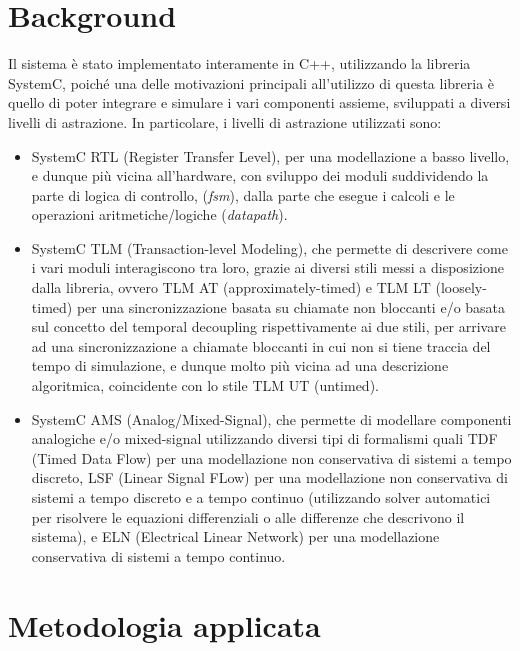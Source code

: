 \documentclass[]{IEEEtran}
\begin{document}
\section{Background}
Il sistema \`e stato implementato interamente in C++, utilizzando la libreria SystemC, poich\'e una delle motivazioni 
principali all'utilizzo di questa libreria \`e quello di poter integrare e simulare i vari componenti assieme, sviluppati 
a diversi livelli di astrazione. In particolare, i livelli di astrazione utilizzati sono:
\begin{itemize}
    \item SystemC RTL\cite{RTL} (Register Transfer Level), per una modellazione a basso livello, e dunque pi\`u vicina 
    all'hardware, con sviluppo dei moduli suddividendo la parte di logica di controllo, (\textit{fsm}), dalla parte che 
    esegue i calcoli e le operazioni aritmetiche/logiche (\textit{datapath}).
    
    \item SystemC\cite{SystemC} TLM (Transaction-level Modeling), che permette di descrivere come i vari moduli 
    interagiscono tra loro, grazie ai diversi stili messi a disposizione dalla libreria, ovvero TLM AT 
    (approximately-timed) e TLM LT (loosely-timed) per una sincronizzazione basata su chiamate non bloccanti e/o basata 
    sul concetto del temporal decoupling rispettivamente ai due stili, per arrivare ad una sincronizzazione a chiamate 
    bloccanti in cui non si tiene traccia del tempo di simulazione, e dunque molto pi\`u vicina ad una descrizione 
    algoritmica, coincidente con lo stile TLM UT (untimed).
    
    \item SystemC AMS\cite{AMS} (Analog/Mixed-Signal), che permette di modellare componenti analogiche e/o mixed-signal 
    utilizzando diversi tipi di formalismi quali TDF (Timed Data Flow) per una modellazione non conservativa di sistemi 
    a tempo discreto, LSF (Linear Signal FLow) per una modellazione non conservativa di sistemi a tempo discreto e a 
    tempo continuo (utilizzando solver automatici per risolvere le equazioni differenziali o alle differenze che 
    descrivono il sistema), e ELN (Electrical Linear Network) per una modellazione conservativa di sistemi a tempo 
    continuo.
\end{itemize}

\section{Metodologia applicata}
\end{document}
